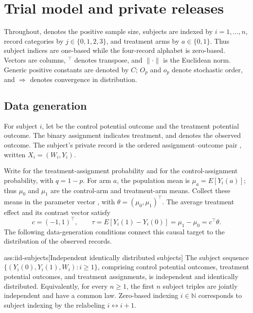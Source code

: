 \documentclass[11pt]{article}
\begin{document}
\section{Trial model and private releases}

Throughout,  denotes the positive sample size, subjects are indexed by \(i=1,\ldots,n\), record categories by \(j\in\{0,1,2,3\}\), and treatment arms by \(a\in\{0,1\}\). Thus subject indices are one-based while the four-record alphabet is zero-based. Vectors are columns, \({}^{\top}\) denotes transpose, and \(\|\cdot\|\) is the Euclidean norm. Generic positive constants are denoted by \(C\); \(O_p\) and \(o_p\) denote stochastic order, and \(\Rightarrow\) denotes convergence in distribution.

\subsection{Data generation}

For subject \(i\), let  be the control potential outcome and  the treatment potential outcome. The binary assignment  indicates treatment, and  denotes the observed outcome. The subject's private record is the ordered assignment--outcome pair , written \(X_i=(W_i,Y_i)\).

Write  for the treatment-assignment probability and  for the control-assignment probability, with \(q=1-p\). For arm \(a\), the population mean  is \(\mu_a=E[Y_i(a)]\); thus \(\mu_0\) and \(\mu_1\) are the control-arm and treatment-arm means. Collect these means in the parameter vector , with \(\theta=(\mu_0,\mu_1)^\top\). The average treatment effect  and its contrast vector  satisfy
\[
c=(-1,1)^\top,
\qquad
\tau=E[Y_i(1)-Y_i(0)]=\mu_1-\mu_0=c^\top\theta.
\]
The following data-generation conditions connect this causal target to the distribution of the observed records.

\begin{assumptionv}{ass:iid-subjects}[Independent identically distributed subjects]
The subject sequence \(\{(Y_i(0),Y_i(1),W_i):i\ge1\}\), comprising control potential outcomes, treatment potential outcomes, and treatment assignments, is independent and identically distributed. Equivalently, for every \(n\ge1\), the first \(n\) subject triples are jointly independent and have a common law. Zero-based indexing \(i\in\mathbb N\) corresponds to subject indexing by the relabeling \(i\leftrightarrow i+1\).
\end{assumptionv}
\end{document}
